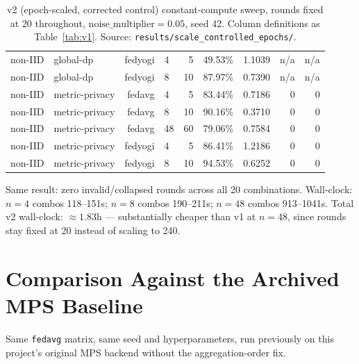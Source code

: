 \documentclass[11pt]{article}
\newcommand{\code}[1]{\texttt{#1}}
\begin{document}
\begin{table}[h]
\begin{tabular}{llrlrrrrr}
non-IID     & global-dp      & fedyogi & 4  & 5  & 49.53\% & 1.1039 & n/a & n/a \\
non-IID     & global-dp      & fedyogi & 8  & 10 & 87.97\% & 0.7390 & n/a & n/a \\
non-IID     & metric-privacy & fedavg  & 4  & 5  & 83.44\% & 0.7186 & 0 & 0 \\
non-IID     & metric-privacy & fedavg  & 8  & 10 & 90.16\% & 0.3710 & 0 & 0 \\
non-IID     & metric-privacy & fedavg  & 48 & 60 & 79.06\% & 0.7584 & 0 & 0 \\
non-IID     & metric-privacy & fedyogi & 4  & 5  & 86.41\% & 1.2186 & 0 & 0 \\
non-IID     & metric-privacy & fedyogi & 8  & 10 & 94.53\% & 0.6252 & 0 & 0 \\
\bottomrule
\end{tabular}
\caption{v2 (epoch-scaled, corrected control) constant-compute sweep, rounds fixed at 20 throughout,
$\text{noise\_multiplier}=0.05$, seed 42. Column definitions as Table~\ref{tab:v1}.
Source: \code{results/scale\_controlled\_epochs/}.}
\label{tab:v2}
\end{table}

\noindent Same result: zero invalid/collapsed rounds across all 20 combinations. Wall-clock:
$n{=}4$ combos 118--151s; $n{=}8$ combos 190--211s; $n{=}48$ combos 913--1041s. Total v2 wall-clock:
$\approx 1.83$h --- substantially cheaper than v1 at $n{=}48$, since rounds stay fixed at 20 instead
of scaling to 240.

\section{Comparison Against the Archived MPS Baseline}
\label{sec:mpscomp}

Same \code{fedavg} matrix, same seed and hyperparameters, run previously on this project's original
MPS backend without the aggregation-order fix.
\end{document}
